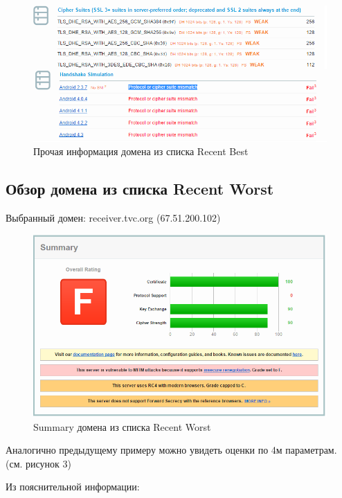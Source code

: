 \documentclass[11pt, a4paper]{article}		%
\begin{document}
\begin{figure}[h!]
\centering
\includegraphics[scale=0.8]{res/info_best_domain}
\caption{Прочая информация домена из списка Recent Best}
\end{figure}




\subsection{Обзор домена из списка Recent Worst}

Выбранный домен: receiver.tvc.org (67.51.200.102)

\begin{figure}[h!]
\centering
\includegraphics[scale=0.8]{res/summary_worst_domain}
\caption{Summary домена из списка Recent Worst}
\end{figure}

Аналогично предыдущему примеру можно увидеть оценки по 4м параметрам. (см. рисунок 3)

Из пояснительной информации:
\end{document}
